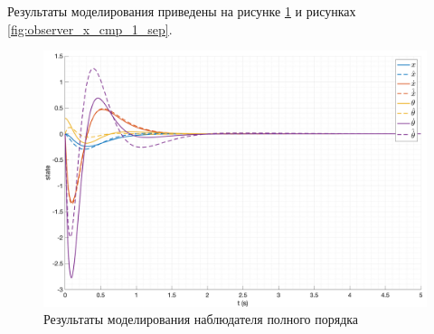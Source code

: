Результаты моделирования приведены на рисунке \ref{fig:observer_x_1} и рисунках \ref{fig:observer_x_cmp_1_sep}. 
\begin{figure}[ht!]
    \centering
    \includegraphics[width=\textwidth]{media/plots/modal_observer/observer_cmp_1.png}
    \caption{Результаты моделирования наблюдателя полного порядка}
    \label{fig:observer_x_1}
\end{figure}
